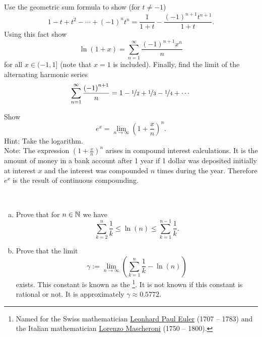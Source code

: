 \begin{exercise}
Use the geometric sum formula to show (for $t\not= -1$)
\begin{equation*}
1-t+t^2-\cdots+{(-1)}^n t^n = \frac{1}{1+t} - \frac{{(-1)}^{n+1}t^{n+1}}{1+t}.
\end{equation*}
Using this fact show
\begin{equation*}
\ln (1+x) = \sum_{n=1}^\infty \frac{{(-1)}^{n+1}x^n}{n} 
\end{equation*}
for all $x \in (-1,1]$ (note that $x=1$ is included).  Finally,
find the limit of the alternating harmonic series
\begin{equation*}
\sum_{n=1}^\infty \frac{{(-1)}^{n+1}}{n} = 1 - \nicefrac{1}{2} +
\nicefrac{1}{3} - \nicefrac{1}{4} + \cdots
\end{equation*}
\end{exercise}

\begin{exercise}
Show 
\begin{equation*}
e^x = \lim_{n\to\infty} {\left( 1 + \frac{x}{n} \right)}^n .
\end{equation*}
Hint: Take the logarithm.\\
Note: The expression 
${\left( 1 + \frac{x}{n} \right)}^n$ arises in compound interest
calculations.  It is the amount of money in a bank account after 1 year
if 1 dollar was deposited initially at interest $x$
and the interest was compounded $n$
times during the year.  Therefore $e^x$ is the result of continuous
compounding.
\end{exercise}

\begin{samepage}
\begin{exercise}
{\ }
\begin{enumerate}[a)]
\item
Prove that for $n \in {\mathbb{N}}$ we have
\begin{equation*}
\sum_{k=2}^{n}
\frac{1}{k}
\leq
\ln (n)
\leq
\sum_{k=1}^{n-1}
\frac{1}{k} .
\end{equation*}
\item
Prove that the limit
\begin{equation*}
\gamma := \lim_{n\to\infty}
\left( \sum_{k=1}^{n}
\frac{1}{k} - \ln (n) \right)
\end{equation*}
exists.  This constant is known as the
\emph{}%
\footnote{Named for the Swiss mathematician
\href{http://en.wikipedia.org/wiki/Leonhard_Euler}{Leonhard Paul Euler} (1707 -- 1783)
and the Italian mathematician
\href{http://en.wikipedia.org/wiki/Lorenzo_Mascheroni}{Lorenzo Mascheroni}
(1750 -- 1800).}.  It is not known if this constant is rational or not.
It is approximately $\gamma \approx 0.5772$.
\end{enumerate}
\end{exercise}
\end{samepage}

